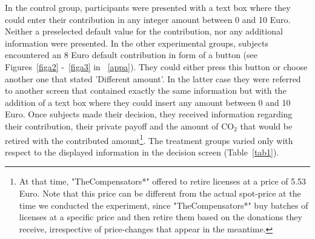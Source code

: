 \documentclass[review, authoryear,12pt]{elsarticle}
\begin{document}
In the control group, participants were presented with a text box where they could enter their contribution in any integer amount between 0 and 10 Euro. Neither a preselected default value for the contribution, nor any additional information were presented. In the other experimental groups, subjects encountered an 8 Euro default contribution in form of a button (see Figures~\ref{figa2} -~\ref{figa3} in ~\ref{appa}). They could either press this button or choose another one that stated 'Different amount'. In the latter case they were referred to another screen that contained exactly the same information but with the addition of a text box where they could insert any amount between 0 and 10 Euro. Once subjects made their decision, they received information regarding their contribution, their private payoff and the amount of CO$_2$ that would be retired with the contributed amount\footnote{At that time, "TheCompensators*" offered to retire licenses at a price of 5.53 Euro. Note that this price can be different from the actual spot-price at the time we conducted the experiment, since "TheCompensators*" buy batches of licenses at a specific price and then retire them based on the donations they receive, irrespective of price-changes that appear in the meantime.}. The treatment groups varied only with respect to the displayed information in the decision screen (Table~\ref{tab1}).
\end{document}
